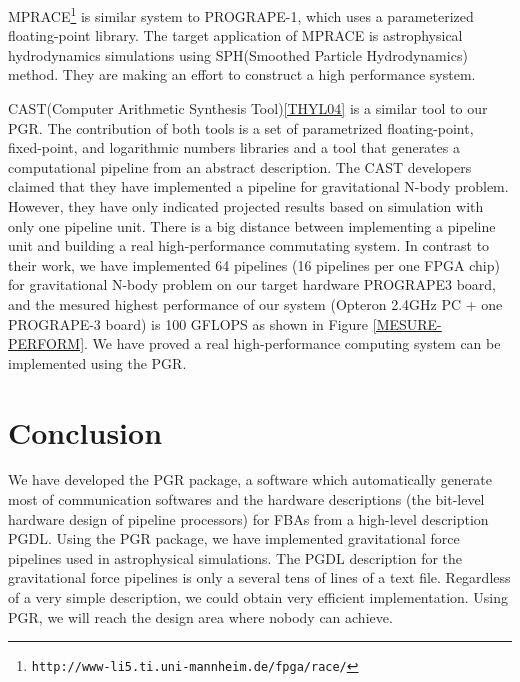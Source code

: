 \documentclass[times, 10pt,twocolumn]{article}
\begin{document}
MPRACE\footnote{\tt http://www-li5.ti.uni-mannheim.de/fpga/race/} is
similar system to PROGRAPE-1, which uses a parameterized
floating-point library\cite{GKM02}.  The target application of MPRACE
is astrophysical hydrodynamics simulations using SPH(Smoothed Particle
Hydrodynamics) method.  They are making an effort to construct a high
performance system.


CAST(Computer Arithmetic Synthesis Tool)\ref{THYL04} is a similar tool
to our PGR.  The contribution of both tools is a set of parametrized
floating-point, fixed-point, and logarithmic numbers libraries and a
tool that generates a computational pipeline from an abstract description.
The CAST developers claimed that they have implemented
a pipeline for gravitational N-body problem. 
However, they have only indicated 
projected results based on simulation with only one pipeline unit.
There is a big distance between implementing a pipeline unit and building a real
high-performance commutating system. In contrast to their work,
we have implemented 64 pipelines (16 pipelines per one FPGA chip)
for gravitational N-body problem on our target hardware PROGRAPE3 board,
and the mesured highest performance of our system
(Opteron 2.4GHz PC + one PROGRAPE-3 board) is 100 GFLOPS as shown in Figure \ref{MESURE-PERFORM}.
We have proved a real high-performance computing system
can be implemented using the PGR.


\section{Conclusion}
We have developed the PGR package, a software which automatically generate
most of communication softwares and the hardware descriptions
(the bit-level hardware design of pipeline processors)
for FBAs from a high-level description PGDL.
Using the PGR package, we have implemented gravitational force
pipelines used in astrophysical simulations.
The PGDL description for the gravitational force pipelines
is only a several tens of lines of a text file.
Regardless of a very simple description, we could obtain very
efficient implementation. 
Using PGR, we will reach the design area where nobody can achieve.
\end{document}

